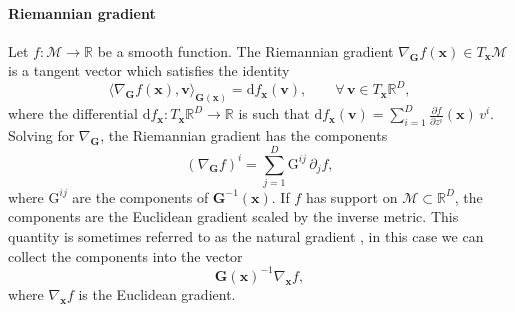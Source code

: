 \paragraph{Riemannian gradient}
Let $f:\mathcal{M}\to\mathbb{R}$ be a smooth function. The Riemannian gradient $\nabla_{\mathbf{G}}f(\boldsymbol{x})\in T_{\boldsymbol{x}}\mathcal{M}$ is a tangent vector which satisfies the identity
\begin{equation*}
    \langle \nabla_{\mathbf{G}} f(\boldsymbol{x}), \boldsymbol{v}\rangle_{\mathbf{G}(\boldsymbol{x})}
=
\mathrm{d}f_{\boldsymbol{x}}(\boldsymbol{v}),
\qquad \forall\, \boldsymbol{v}\in T_{\boldsymbol{x}}\mathbb{R}^D,
\end{equation*}
where the differential $\mathrm{d}f_{\boldsymbol{x}}:T_{\boldsymbol{x}}\mathbb{R}^D\to\mathbb{R}$ is such that $\mathrm{d}f_{\boldsymbol{x}}(\boldsymbol v)
=
\sum_{i=1}^D \frac{\partial f}{\partial z^i}(\boldsymbol{x})\, v^i$.
Solving for $\nabla_{\mathbf{G}}$, the Riemannian gradient has the components
\begin{equation}
(\nabla_{\mathbf{G}} f)^i
=
\sum_{j=1}^D \mathrm{G}^{ij}\,\partial_j f,
\label{eq:riemannian_gradient}
\end{equation}
where $\mathrm{G}^{ij}$ are the components of $\mathbf{G}^{-1}(\boldsymbol{x})$. 
If $f$ has support on $\mathcal{M}\subset\mathbb{R}^D$, the components are the Euclidean gradient scaled by the inverse metric. This quantity is sometimes referred to as the natural gradient \citep{amari1998natural}, in this case we can collect the components into the vector
\begin{equation*}
    \mathbf{G}(\boldsymbol{x})^{-1}\nabla_{\boldsymbol{x}}f, 
\end{equation*}
where $\nabla_{\boldsymbol{x}}f$ is the Euclidean gradient. 


